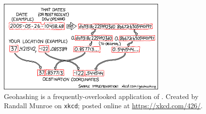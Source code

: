 \begin{figure}[t]
\centering
    \includegraphics[width=0.75\textwidth]{figures/xkcd/xkcd_426_geohashing.png}
    \caption[\texttt{xkcd} Geohashing]{Geohashing is a
        frequently-overlooked application of .
        Created by Randall Munroe on \texttt{xkcd};
        posted online at \url{https://xkcd.com/426/}.
        }
    \label{fig:xkcd_geohashing}
\end{figure}
